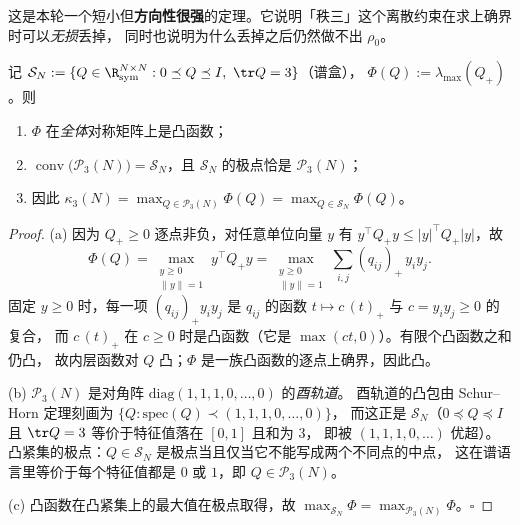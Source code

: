 这是本轮一个短小但\textbf{方向性很强}的定理。它说明「秩三」这个离散约束在求上确界时可以\emph{无损}丢掉，
同时也说明为什么丢掉之后仍然做不出 $\rho_0$。

\begin{theorem}[凸性与谱盒归约，已证]\label{thm:convex}
记 $\mathcal S_N:=\{Q\in\R^{N\times N}_{\rm sym}:0\preceq Q\preceq I,\ \tr Q=3\}$（谱盒），
$\Phi(Q):=\lambda_{\max}(Q_+)$。则
\begin{enumerate}[label=(\alph*),leftmargin=2.2em]
\item $\Phi$ 在\emph{全体}对称矩阵上是凸函数；
\item $\operatorname{conv}\bigl(\mathcal P_3(N)\bigr)=\mathcal S_N$，且 $\mathcal S_N$ 的极点恰是 $\mathcal P_3(N)$；
\item 因此 $\kappa_3(N)=\max_{Q\in\mathcal P_3(N)}\Phi(Q)=\max_{Q\in\mathcal S_N}\Phi(Q)$。
\end{enumerate}
\end{theorem}

\begin{proof}
(a) 因为 $Q_+\ge0$ 逐点非负，对任意单位向量 $y$ 有 $y^\top Q_+y\le|y|^\top Q_+|y|$，故
\[
\Phi(Q)=\max_{\substack{y\ge0\\ \|y\|=1}}y^\top Q_+y=\max_{\substack{y\ge0\\ \|y\|=1}}\sum_{i,j}(q_{ij})_+\,y_iy_j .
\]
固定 $y\ge0$ 时，每一项 $(q_{ij})_+y_iy_j$ 是 $q_{ij}$ 的函数 $t\mapsto c\,(t)_+$ 与 $c=y_iy_j\ge0$ 的复合，
而 $c\,(t)_+$ 在 $c\ge0$ 时是凸函数（它是 $\max(ct,0)$）。有限个凸函数之和仍凸，
故内层函数对 $Q$ 凸；$\Phi$ 是一族凸函数的逐点上确界，因此凸。

(b) $\mathcal P_3(N)$ 是对角阵 $\mathrm{diag}(1,1,1,0,\dots,0)$ 的\emph{酉轨道}。
酉轨道的凸包由 Schur--Horn 定理刻画为 $\{Q:\mathrm{spec}(Q)\prec(1,1,1,0,\dots,0)\}$，
而这正是 $\mathcal S_N$（$0\preceq Q\preceq I$ 且 $\tr Q=3$ 等价于特征值落在 $[0,1]$ 且和为 $3$，
即被 $(1,1,1,0,\dots)$ 优超）。凸紧集的极点：$Q\in\mathcal S_N$ 是极点当且仅当它不能写成两个不同点的中点，
这在谱语言里等价于每个特征值都是 $0$ 或 $1$，即 $Q\in\mathcal P_3(N)$。

(c) 凸函数在凸紧集上的最大值在极点取得，故 $\max_{\mathcal S_N}\Phi=\max_{\mathcal P_3(N)}\Phi$。$\square$
\end{proof}

